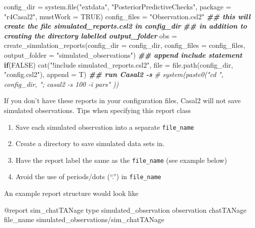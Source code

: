 \documentclass[
]{book}
\newenvironment{Shaded}{\begin{snugshade}}{\end{snugshade}}
\newcommand{\AttributeTok}[1]{\textcolor[rgb]{0.77,0.63,0.00}{#1}}
\newcommand{\BuiltInTok}[1]{#1}
\newcommand{\CommentTok}[1]{\textcolor[rgb]{0.56,0.35,0.01}{\textit{#1}}}
\newcommand{\ConstantTok}[1]{\textcolor[rgb]{0.00,0.00,0.00}{#1}}
\newcommand{\ControlFlowTok}[1]{\textcolor[rgb]{0.13,0.29,0.53}{\textbf{#1}}}
\newcommand{\DocumentationTok}[1]{\textcolor[rgb]{0.56,0.35,0.01}{\textbf{\textit{#1}}}}
\newcommand{\ExtensionTok}[1]{#1}
\newcommand{\FunctionTok}[1]{\textcolor[rgb]{0.00,0.00,0.00}{#1}}
\newcommand{\NormalTok}[1]{#1}
\newcommand{\OtherTok}[1]{\textcolor[rgb]{0.56,0.35,0.01}{#1}}
\newcommand{\StringTok}[1]{\textcolor[rgb]{0.31,0.60,0.02}{#1}}
\providecommand{\tightlist}{%
  \setlength{\itemsep}{0pt}\setlength{\parskip}{0pt}}
\begin{document}
\begin{Shaded}
\begin{Highlighting}[]
\NormalTok{config\_dir }\OtherTok{=} \FunctionTok{system.file}\NormalTok{(}\StringTok{"extdata"}\NormalTok{, }\StringTok{"PosteriorPredictiveChecks"}\NormalTok{, }\AttributeTok{package =} \StringTok{"r4Casal2"}\NormalTok{, }\AttributeTok{mustWork =} \ConstantTok{TRUE}\NormalTok{)}
\NormalTok{config\_files }\OtherTok{=} \StringTok{"Observation.csl2"}
\DocumentationTok{\#\# this will create the file \textquotesingle{}simulated\_reports.csl2\textquotesingle{} in config\_dir}
\DocumentationTok{\#\# in addition to creating the directory labelled output\_folder}
\NormalTok{obs }\OtherTok{=} \FunctionTok{create\_simulation\_reports}\NormalTok{(}\AttributeTok{config\_dir =}\NormalTok{ config\_dir, }\AttributeTok{config\_files =}\NormalTok{ config\_files,}
                                \AttributeTok{output\_folder =} \StringTok{"simulated\_observations"}\NormalTok{)}
\DocumentationTok{\#\# append include statement }
\ControlFlowTok{if}\NormalTok{(}\ConstantTok{FALSE}\NormalTok{)}
  \FunctionTok{cat}\NormalTok{(}\StringTok{"!include simulated\_reports.csl2"}\NormalTok{, }\AttributeTok{file =} 
        \FunctionTok{file.path}\NormalTok{(config\_dir, }\StringTok{"config.csl2"}\NormalTok{), }\AttributeTok{append =}\NormalTok{ T)}
\DocumentationTok{\#\# run Casal2 {-}s}
\CommentTok{\# system(paste0("cd ", config\_dir, "; casal2 {-}s 100 {-}i pars" ))}
\end{Highlighting}
\end{Shaded}

If you don't have these reports in your configuration files, Casal2 will not save simulated observations. Tips when specifying this report class

\begin{enumerate}
\def\labelenumi{\arabic{enumi}.}
\tightlist
\item
  Save each simulated observation into a separate \texttt{file\_name}
\item
  Create a directory to save simulated data sets in.
\item
  Have the report label the same as the \texttt{file\_name} (see example below)
\item
  Avoid the use of periods/dots (``.'') in \texttt{file\_name}
\end{enumerate}

An example report structure would look like

\begin{Shaded}
\begin{Highlighting}[]
\ExtensionTok{@report}\NormalTok{ sim\_chatTANage}
\BuiltInTok{type}\NormalTok{ simulated\_observation}
\ExtensionTok{observation}\NormalTok{ chatTANage}
\ExtensionTok{file\_name}\NormalTok{ simulated\_observations/sim\_chatTANage}
\end{Highlighting}
\end{Shaded}
\end{document}
